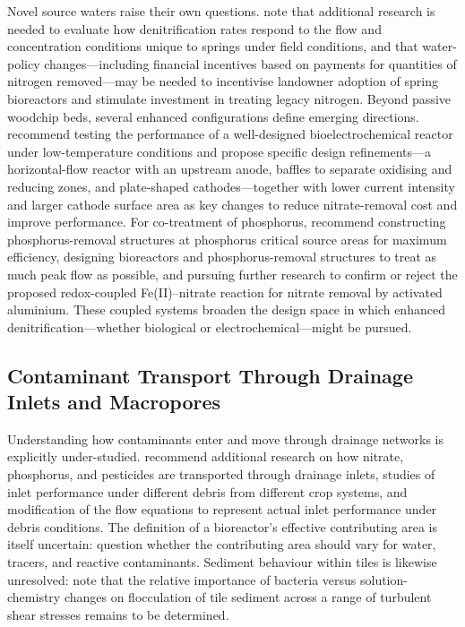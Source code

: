 \documentclass[11pt]{article}
\begin{document}
Novel source waters raise their own questions. \textcite{Easton2019} note that additional research is needed to evaluate how denitrification rates respond to the flow and concentration conditions unique to springs under field conditions, and that water-policy changes---including financial incentives based on payments for quantities of nitrogen removed---may be needed to incentivise landowner adoption of spring bioreactors and stimulate investment in treating legacy nitrogen. Beyond passive woodchip beds, several enhanced configurations define emerging directions. \textcite{Law2018} recommend testing the performance of a well-designed bioelectrochemical reactor under low-temperature conditions and propose specific design refinements---a horizontal-flow reactor with an upstream anode, baffles to separate oxidising and reducing zones, and plate-shaped cathodes---together with lower current intensity and larger cathode surface area as key changes to reduce nitrate-removal cost and improve performance. For co-treatment of phosphorus, \textcite{Penn2024} recommend constructing phosphorus-removal structures at phosphorus critical source areas for maximum efficiency, designing bioreactors and phosphorus-removal structures to treat as much peak flow as possible, and pursuing further research to confirm or reject the proposed redox-coupled Fe(II)--nitrate reaction for nitrate removal by activated aluminium. These coupled systems broaden the design space in which enhanced denitrification---whether biological or electrochemical---might be pursued.

\subsection{Contaminant Transport Through Drainage Inlets and Macropores}
Understanding how contaminants enter and move through drainage networks is explicitly under-studied. \textcite{Li2017b} recommend additional research on how nitrate, phosphorus, and pesticides are transported through drainage inlets, studies of inlet performance under different debris from different crop systems, and modification of the flow equations to represent actual inlet performance under debris conditions. The definition of a bioreactor's effective contributing area is itself uncertain: \textcite{Akay2008} question whether the contributing area should vary for water, tracers, and reactive contaminants. Sediment behaviour within tiles is likewise unresolved: \textcite{Stone1997} note that the relative importance of bacteria versus solution-chemistry changes on flocculation of tile sediment across a range of turbulent shear stresses remains to be determined.
\end{document}
